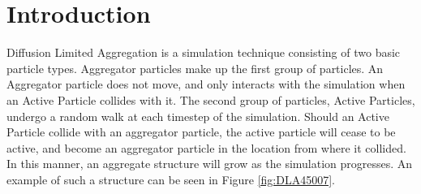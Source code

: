 \documentclass[fleqn,10pt]{UserGuideArx} %
\begin{document}
\flushbottom %

\maketitle %

\tableofcontents %

\thispagestyle{empty} %


\section*{Introduction} %


Diffusion Limited Aggregation is a simulation technique consisting of two basic particle types. Aggregator particles make up the first group of particles. An Aggregator particle does not move, and only interacts with the simulation when an Active Particle collides with it. The second group of particles, Active Particles, undergo a random walk at each timestep of the simulation. Should an Active Particle collide with an aggregator particle, the active particle will cease to be active, and become an aggregator particle in the location from where it collided. In this manner, an aggregate structure will grow as the simulation progresses. An example of such a structure can be seen in Figure \ref{fig:DLA45007}.
\end{document}
